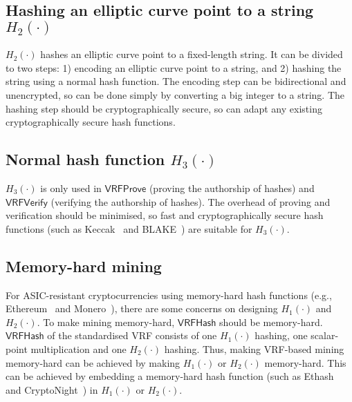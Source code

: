 \subsection{Hashing an elliptic curve point to a string $H_{2}(\cdot)$}

$H_{2}(\cdot)$ hashes an elliptic curve point to a fixed-length string.
It can be divided to two steps: 1) encoding an elliptic curve point to a string, and 2) hashing the string using a normal hash function.
The encoding step can be bidirectional and unencrypted, so can be done simply by converting a big integer to a string.
The hashing step should be cryptographically secure, so can adapt any existing cryptographically secure hash functions.


\subsection{Normal hash function $H_{3}(\cdot)$}

$H_{3}(\cdot)$ is only used in $\mathsf{VRFProve}$ (proving the authorship of hashes) and $\mathsf{VRFVerify}$ (verifying the authorship of hashes).
The overhead of proving and verification should be minimised, so fast and cryptographically secure hash functions (such as Keccak~\cite{bertoni2013keccak} and BLAKE~\cite{aumasson2008sha}) are suitable for $H_{3}(\cdot)$.

\subsection{Memory-hard mining}

For ASIC-resistant cryptocurrencies using memory-hard hash functions (e.g., Ethereum~\cite{wood2014ethereum} and Monero~\cite{monero}), there are some concerns on designing $H_{1}(\cdot)$ and $H_{2}(\cdot)$.
To make mining memory-hard, $\mathsf{VRFHash}$ should be memory-hard.
$\mathsf{VRFHash}$ of the standardised VRF consists of one $H_{1}(\cdot)$ hashing, one scalar-point multiplication and one $H_{2}(\cdot)$ hashing.
Thus, making VRF-based mining memory-hard can be achieved by making $H_{1}(\cdot)$ or $H_{2}(\cdot)$ memory-hard.
This can be achieved by embedding a memory-hard hash function (such as Ethash~\cite{wiki2017ethash} and CryptoNight~\cite{seigenneocortex}) in $H_1(\cdot)$ or $H_2(\cdot)$.